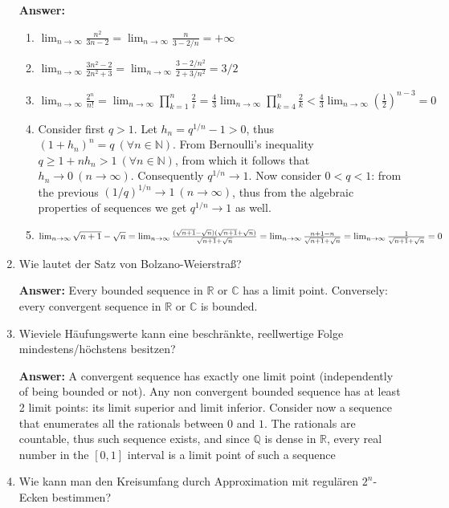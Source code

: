 \documentclass[11pt]{article}
\newcommand{\RR}[0]{\mathbb{R}}
\newcommand{\CC}[0]{\mathbb{C}}
\newcommand{\QQ}[0]{\mathbb{Q}}
\newcommand{\NN}[0]{\mathbb{N}}
\newcommand{\slim}[2]{\lim_{#1\to\infty}{#2}}
\begin{document}
\begin{enumerate}
    \textbf{Answer:}
    \begin{enumerate}
        \item $\lim_{n\to\infty}\frac{n^2}{3n - 2} = \lim_{n\to\infty}\frac{n}{3 - 2/n} = +\infty$
        \item $\lim_{n\to\infty}\frac{3n^2 - 2}{2n^2+3} = \lim_{n\to\infty}\frac{3 - 2/n^2}{2+3/n^2} = 3/2$
        \item $\lim_{n\to\infty}\frac{2^n}{n!} = \lim_{n\to\infty}\prod_{k=1}^n{\frac{2}{i}} = \frac{4}{3} \lim_{n\to\infty}\prod_{k=4}^n{\frac{2}{k}} < \frac{4}{3} \lim_{n\to\infty}{\left(\frac{1}{2}\right)}^{n-3} = 0 $
        \item Consider first $q>1$. Let $h_n = q^{1/n} - 1 > 0$, thus $(1+h_n)^n = q~(\forall n \in \NN)$. From Bernoulli's inequality $q \ge 1 + n h_n>1~(\forall n\in\NN)$, from which it follows that $h_n \to 0~(n\to\infty)$. Consequently $q^{1/n} \to 1$. Now consider $0 < q < 1$: from the previous $(1/q)^{1/n} \to 1~(n \to \infty)$, thus from the algebraic properties of sequences we get $q^{1/n} \to 1$ as well.
        \item $\lim_{n\to\infty} \sqrt{n+1} - \sqrt{n} = \lim_{n\to\infty} \frac{( \sqrt{n+1} - \sqrt{n})( \sqrt{n+1} + \sqrt{n})}{ \sqrt{n+1} + \sqrt{n}} = \lim_{n\to\infty}\frac{n+1 - n}{\sqrt{n+1} + \sqrt{n}} \\= \slim{n} {\frac{1}{\sqrt{n+1} + \sqrt{n}}} = 0$
    \end{enumerate}

    \item Wie lautet der Satz von Bolzano-Weierstraß?

    \textbf{Answer:} Every bounded sequence in $\RR$ or $\CC$ has a limit point. Conversely: every convergent sequence in $\RR$ or $\CC$ is bounded.

    \item Wieviele Häufungswerte kann eine beschränkte, reellwertige Folge mindestens/höchstens besitzen?

    \textbf{Answer:} A convergent sequence has exactly one limit point (independently of being bounded or not). Any non convergent bounded sequence has at least 2 limit points: its limit superior and limit inferior. Consider now a sequence that enumerates all the rationals between $0$ and $1$. The rationals are countable, thus such sequence exists, and since $\QQ$ is dense in $\RR$, every real number in the $[0, 1]$ interval is a limit point of such a sequence

    \item Wie kann man den Kreisumfang durch Approximation mit regulären $2^n$-Ecken bestimmen?


\end{enumerate}
\end{document}
